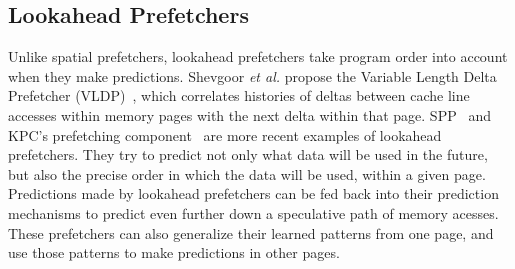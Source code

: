 

\subsection{Lookahead Prefetchers}

Unlike spatial prefetchers, lookahead prefetchers take program order into
account when they make predictions. Shevgoor \textit{et al.} propose the Variable 
Length Delta Prefetcher (VLDP)~\cite{VLDP}, which correlates histories of
deltas between cache line accesses within memory pages with the next delta
within that page. SPP~\cite{SPP} and KPC's prefetching component~\cite{KPC} are
more recent examples of lookahead prefetchers. They try to predict not only what
data will be used in the future, but also the precise order in which the data
will be used, within a given page. Predictions made by lookahead prefetchers can
be fed back into their prediction mechanisms to predict even further down 
a speculative path of memory acesses. These prefetchers can also generalize their
learned patterns from one page, and use those patterns to make predictions in 
other pages.


